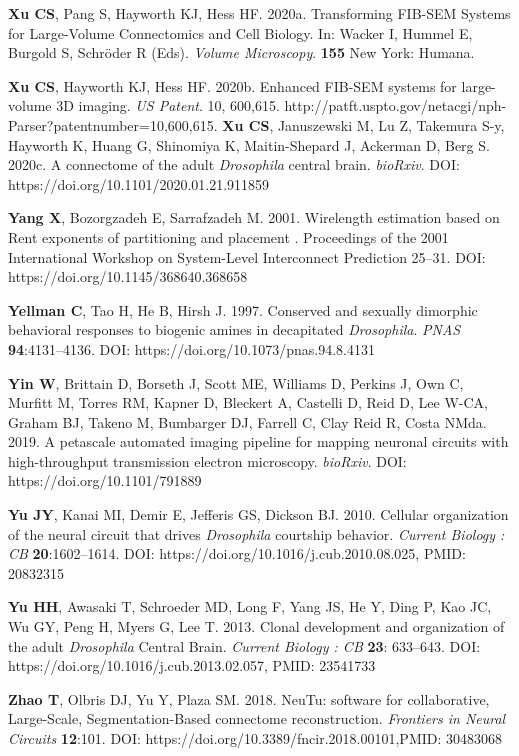 \documentclass{article}
\begin{document}
\begin{hangpars}
\textbf{Xu CS}, Pang S, Hayworth KJ, Hess HF. 2020a. Transforming FIB-SEM Systems for Large-Volume Connectomics and Cell Biology. In: Wacker I, Hummel E, Burgold S, Schröder R (Eds). \emph{Volume Microscopy}. \textbf{155} New York: Humana.

\textbf{Xu CS}, Hayworth KJ, Hess HF. 2020b. Enhanced FIB-SEM systems for large-volume 3D imaging. \emph{US Patent}. 10, 600,615. http://patft.uspto.gov/netacgi/nph-Parser?patentnumber=10,600,615. \textbf{Xu CS}, Januszewski M, Lu Z, Takemura S-y, Hayworth K, Huang G, Shinomiya K, Maitin-Shepard J, Ackerman D, Berg S. 2020c. A connectome of the adult \emph{Drosophila} central brain. \emph{bioRxiv}. DOI: https://doi.org/10.1101/2020.01.21.911859

\textbf{Yang X}, Bozorgzadeh E, Sarrafzadeh M. 2001. Wirelength estimation based on Rent exponents of partitioning and placement . Proceedings of the 2001 International Workshop on System-Level Interconnect Prediction 25–31. DOI: https://doi.org/10.1145/368640.368658

\textbf{Yellman C}, Tao H, He B, Hirsh J. 1997. Conserved and sexually dimorphic behavioral responses to biogenic amines in decapitated \emph{Drosophila}. \emph{PNAS} \textbf{94}:4131–4136. DOI: https://doi.org/10.1073/pnas.94.8.4131

\textbf{Yin W}, Brittain D, Borseth J, Scott ME, Williams D, Perkins J, Own C, Murfitt M, Torres RM, Kapner D, Bleckert A, Castelli D, Reid D, Lee W-CA, Graham BJ, Takeno M, Bumbarger DJ, Farrell C, Clay Reid R, Costa NMda. 2019. A petascale automated imaging pipeline for mapping neuronal circuits with high-throughput transmission electron microscopy. \emph{bioRxiv}. DOI: https://doi.org/10.1101/791889

\textbf{Yu JY}, Kanai MI, Demir E, Jefferis GS, Dickson BJ. 2010. Cellular organization of the neural circuit that drives \emph{Drosophila} courtship behavior. \emph{Current Biology : CB} \textbf{20}:1602–1614. DOI: https://doi.org/10.1016/j.cub.2010.08.025, PMID: 20832315

\textbf{Yu HH}, Awasaki T, Schroeder MD, Long F, Yang JS, He Y, Ding P, Kao JC, Wu GY, Peng H, Myers G, Lee T. 2013. Clonal development and organization of the adult \emph{Drosophila} Central Brain. \emph{Current Biology : CB} \textbf{23}: 633–643. DOI: https://doi.org/10.1016/j.cub.2013.02.057, PMID: 23541733

\textbf{Zhao T}, Olbris DJ, Yu Y, Plaza SM. 2018. NeuTu: software for collaborative, Large-Scale, Segmentation-Based connectome reconstruction. \emph{Frontiers in Neural Circuits} \textbf{12}:101. DOI: https://doi.org/10.3389/fncir.2018.00101,PMID: 30483068


\end{hangpars}
\end{document}
